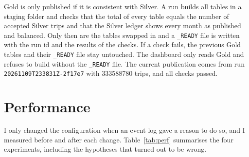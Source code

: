 \documentclass[11pt,a4paper]{article}
\newcommand{\code}[1]{\texttt{\small #1}}
\begin{document}
Gold is only published if it is consistent with Silver. A run builds all tables in a staging folder and checks that the
total of every table equals the number of accepted Silver trips and that the Silver ledger shows every month as published
and balanced. Only then are the tables swapped in and a \code{\_READY} file is written with the run id and the results of
the checks. If a check fails, the previous Gold tables and their \code{\_READY} file stay untouched. The dashboard only reads
Gold and refuses to build without the \code{\_READY} file. The current publication comes from run
\code{20261109T233831Z-2f17e7} with \num{333588780} trips, and all checks passed.

\section{Performance}
\label{sec:perf}

I only changed the configuration when an event log gave a reason to do so, and I measured before and after each change.
Table~\ref{tab:perf} summarises the four experiments, including the hypotheses that turned out to be wrong.
\end{document}
